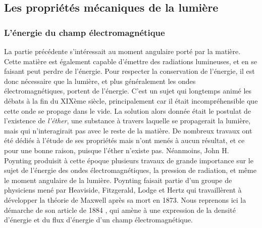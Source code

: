 \subsection{Les propriétés mécaniques de la lumière}
\subsubsection{L'énergie du champ électromagnétique}
La partie précédente s'intéressait au moment angulaire porté par la matière. Cette matière est également capable d'émettre des radiations lumineuses, et en se faisant peut perdre de l'énergie. Pour respecter la conservation de l'énergie, il est donc nécessaire que la lumière, et plus généralement les ondes électromagnétiques, portent de l'énergie. C'est un sujet qui longtemps animé les débats à la fin du XIXème siècle, principalement car il était incompréhensible que cette onde se propage dans le vide. La solution alors donnée était le postulat de l'existence de \textit{l'éther}, une substance à travers laquelle se propagerait la lumière, mais qui n’interagirait pas avec le reste de la matière. De nombreux travaux ont été dédiés à l'étude de ses propriétés mais n'ont menés à aucun résultat, et ce pour une bonne raison, puisque l'éther n'existe pas. Néanmoins, John H. Poynting produisit à cette époque plusieurs travaux de grande importance sur le sujet de l'énergie des ondes électromagnétiques, la pression de radiation, et même le moment angulaire de la lumière. Poynting faisait partie d'un groupe de physiciens mené par Heaviside, Fitzgerald, Lodge et Hertz qui travaillèrent à développer la théorie de Maxwell après sa mort en 1873. Nous reprenons ici la démarche de son article de 1884 , qui amène à une expression de la densité d'énergie et du flux d'énergie d'un champ électromagnétique.

